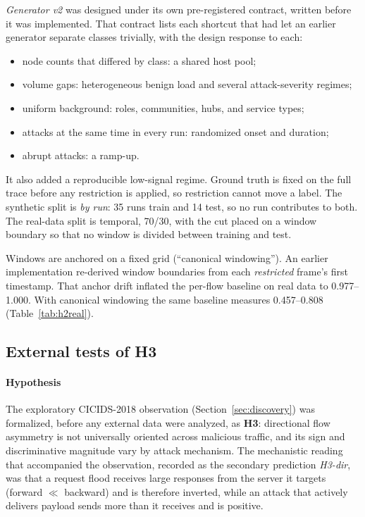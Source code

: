 \documentclass[preprint,12pt]{elsarticle}
\begin{document}
\emph{Generator v2} was designed under its own pre-registered contract, written before it was implemented. That contract lists each shortcut that had let an earlier generator separate classes trivially, with the design response to each:
\begin{itemize}
\item node counts that differed by class: a shared host pool;
\item volume gaps: heterogeneous benign load and several attack-severity regimes;
\item uniform background: roles, communities, hubs, and service types;
\item attacks at the same time in every run: randomized onset and duration;
\item abrupt attacks: a ramp-up.
\end{itemize}
It also added a reproducible low-signal regime. Ground truth is fixed on the full trace before any restriction is applied, so restriction cannot move a label. The synthetic split is \emph{by run}: 35 runs train and 14 test, so no run contributes to both. The real-data split is temporal, 70/30, with the cut placed on a window boundary so that no window is divided between training and test.

Windows are anchored on a fixed grid (``canonical windowing''). An earlier implementation re-derived window boundaries from each \emph{restricted} frame's first timestamp. That anchor drift inflated the per-flow baseline on real data to 0.977--1.000. With canonical windowing the same baseline measures 0.457--0.808 (Table~\ref{tab:h2real}).

\subsection{External tests of H3}\label{sec:h3methods}

\paragraph{Hypothesis} The exploratory CICIDS-2018 observation (Section~\ref{sec:discovery}) was formalized, before any external data were analyzed, as \textbf{H3}: directional flow asymmetry is not universally oriented across malicious traffic, and its sign and discriminative magnitude vary by attack mechanism. The mechanistic reading that accompanied the observation, recorded as the secondary prediction \emph{H3-dir}, was that a request flood receives large responses from the server it targets (forward $\ll$ backward) and is therefore inverted, while an attack that actively delivers payload sends more than it receives and is positive.
\end{document}
